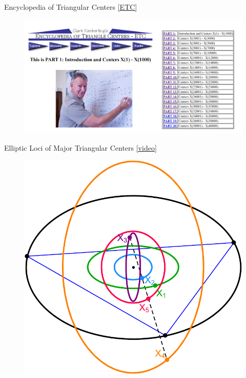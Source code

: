 \begin{frame}{Encyclopedia of Triangular Centers \href{https://faculty.evansville.edu/ck6/encyclopedia/ETC.html}{[ETC]}}
\begin{figure}
\includegraphics[height=.8\textheight]{pics/0000_etc.png}
\end{figure}
\end{frame}

\begin{frame}{Elliptic Loci of Major Triangular Centers \href{https://youtu.be/sMcNzcYaqtg}{[video]}}
\begin{figure}
\includegraphics[height=.75\textheight]{pics/0030_x12345_locus.pdf}
\end{figure}
\end{frame}

